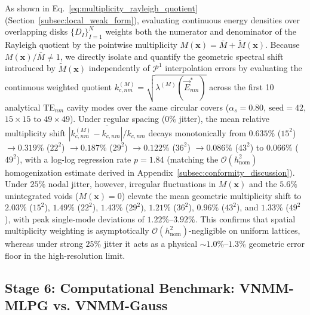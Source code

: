 \documentclass[VANCOUVER,Times1COL]{WileyNJD-v5}
\begin{document}
As shown in Eq.~\eqref{eq:multiplicity_rayleigh_quotient} (Section~\ref{subsec:local_weak_form}), evaluating continuous energy densities over overlapping disks $\{D_I\}_{I=1}^N$ weights both the numerator and denominator of the Rayleigh quotient by the pointwise multiplicity $M(\mathbf{x}) = \bar{M} + \widetilde{M}(\mathbf{x})$. Because $M(\mathbf{x})/\bar{M} \ne 1$, we directly isolate and quantify the geometric spectral shift introduced by $\widetilde{M}(\mathbf{x})$ independently of $\mathcal{P}^1$ interpolation errors by evaluating the continuous weighted quotient $k_{c,nm}^{(M)} = \sqrt{\lambda^{(M)}(\vec{E}_{nm}^*)}$ across the first 10 analytical $\mathrm{TE}_{nm}$ cavity modes over the same circular covers ($\alpha_s = 0.80$, $\text{seed}=42$, $15\times 15$ to $49\times 49$). Under regular spacing ($0\%$ jitter), the mean relative multiplicity shift $\overline{|k_{c,nm}^{(M)} - k_{c,nm}|/k_{c,nm}}$ decays monotonically from $0.635\%$ ($15^2$) $\to 0.319\%$ ($22^2$) $\to 0.187\%$ ($29^2$) $\to 0.122\%$ ($36^2$) $\to 0.086\%$ ($43^2$) to $0.066\%$ ($49^2$), with a log-log regression rate $p = 1.84$ (matching the $\mathcal{O}(h_{\mathrm{nom}}^2)$ homogenization estimate derived in Appendix~\ref{subsec:conformity_discussion}). Under $25\%$ nodal jitter, however, irregular fluctuations in $M(\mathbf{x})$ and the $5.6\%$ unintegrated voids ($M(\mathbf{x})=0$) elevate the mean geometric multiplicity shift to $2.03\%$ ($15^2$), $1.49\%$ ($22^2$), $1.43\%$ ($29^2$), $1.21\%$ ($36^2$), $0.96\%$ ($43^2$), and $1.33\%$ ($49^2$), with peak single-mode deviations of $1.22\%\text{--}3.92\%$. This confirms that spatial multiplicity weighting is asymptotically $\mathcal{O}(h_{\mathrm{nom}}^2)$-negligible on uniform lattices, whereas under strong $25\%$ jitter it acts as a physical $\sim 1.0\%\text{--}1.3\%$ geometric error floor in the high-resolution limit.

\subsection{Stage 6: Computational Benchmark: VNMM-MLPG vs. VNMM-Gauss}
\label{subsec:stage6_benchmark}
\end{document}
